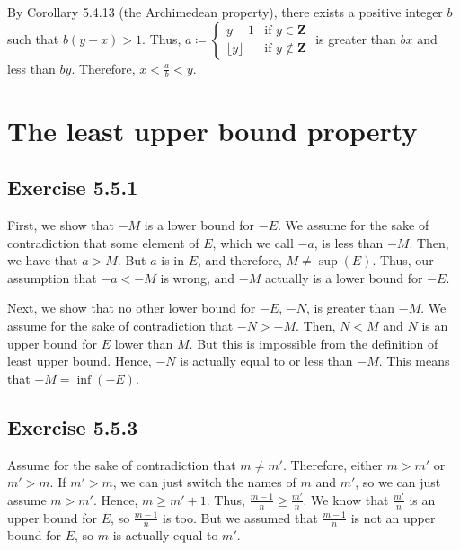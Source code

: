\documentclass[12pt, oneside]{book}
\begin{document}
	By Corollary 5.4.13 (the Archimedean property), there exists a positive integer $b$ such that $b(y - x) > 1$. Thus, $a \coloneqq
	\begin{cases}
		y - 1 & \text{if } y \in \mathbf{Z} \\
		\lfloor y \rfloor & \text{if } y \not \in \mathbf{Z}
	\end{cases}$
	is greater than $bx$ and less than $by$. Therefore, $x < \frac{a}{b} < y$.
	
	\section{The least upper bound property}
	
	\subsection*{Exercise 5.5.1}
	
	First, we show that $-M$ is a lower bound for $-E$. We assume for the sake of contradiction that some element of $E$, which we call $-a$, is less than $-M$. Then, we have that $a > M$. But $a$ is in $E$, and therefore, $M \ne \sup(E)$. Thus, our assumption that $-a < -M$ is wrong, and $-M$ actually is a lower bound for $-E$.
	
	Next, we show that no other lower bound for $-E$, $-N$, is greater than $-M$. We assume for the sake of contradiction that $-N > -M$. Then, $N < M$ and $N$ is an upper bound for $E$ lower than $M$. But this is impossible from the definition of least upper bound. Hence, $-N$ is actually equal to or less than $-M$. This means that $-M = \inf(-E)$.
	
	\subsection*{Exercise 5.5.3}
	
	Assume for the sake of contradiction that $m \ne m'$. Therefore, either $m > m'$ or $m' > m$. If $m' > m$, we can just switch the names of $m$ and $m'$, so we can just assume $m > m'$. Hence, $m \ge m' + 1$. Thus, $\frac{m - 1}{n} \ge \frac{m'}{n}$. We know that $\frac{m'}{n}$ is an upper bound for $E$, so $\frac{m - 1}{n}$ is too. But we assumed that $\frac{m - 1}{n}$ is not an upper bound for $E$, so $m$ is actually equal to $m'$.
	
\end{document}
